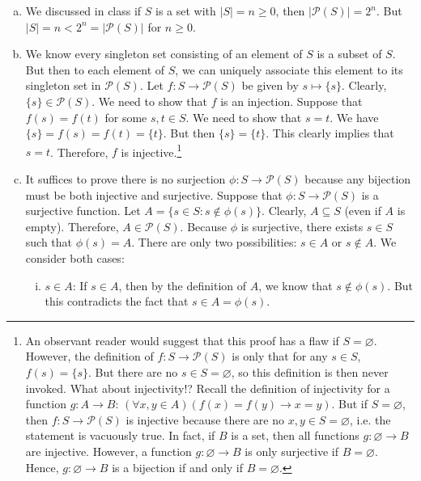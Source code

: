 \documentclass[11pt,letterpaper]{article}
\begin{document}
\sol 
\begin{enumerate}[(a)]
\item We discussed in class if $S$ is a set with $|S|= n \geq 0$, then $|\mathcal{P}(S)|= 2^n$. But $|S|= n < 2^n= |\mathcal{P}(S)|$ for $n \geq 0$. \pspace

\item We know every singleton set consisting of an element of $S$ is a subset of $S$. But then to each element of $S$, we can uniquely associate this element to its singleton set in $\mathcal{P}(S)$. Let $f: S \to \mathcal{P}(S)$ be given by $s \mapsto \{ s \}$. Clearly, $\{ s \} \in \mathcal{P}(S)$. We need to show that $f$ is an injection. Suppose that $f(s)= f(t)$ for some $s, t \in S$. We need to show that $s= t$. We have $\{ s \}= f(s)= f(t)= \{ t \}$. But then $\{ s \}= \{ t \}$. This clearly implies that $s= t$. Therefore, $f$ is injective.\footnote{An observant reader would suggest that this proof has a flaw if $S= \varnothing$. However, the definition of $f: S \to \mathcal{P}(S)$ is only that for any $s \in S$, $f(s)= \{ s \}$. But there are no $s \in S= \varnothing$, so this definition is then never invoked. What about injectivity!? Recall the definition of injectivity for a function $g: A \to B$: $(\forall x, y \in A)( f(x)= f(y) \to x= y)$. But if $S= \varnothing$, then $f: S \to \mathcal{P}(S)$ is injective because there are no $x, y \in S= \varnothing$, i.e. the statement is vacuously true. In fact, if $B$ is a set, then all functions $g: \varnothing \to B$ are injective. However, a function $g: \varnothing \to B$ is only surjective if $B= \varnothing$. Hence, $g: \varnothing \to B$ is a bijection if and only if $B= \varnothing$.} \pspace

\item It suffices to prove there is no surjection $\phi: S \to \mathcal{P}(S)$ because any bijection must be both injective and surjective. Suppose that $\phi: S \to \mathcal{P}(S)$ is a surjective function. Let $A= \{ s \in S \colon s \notin \phi(s) \}$. Clearly, $A \subseteq S$ (even if $A$ is empty). Therefore, $A \in \mathcal{P}(S)$. Because $\phi$ is surjective, there exists $s \in S$ such that $\phi(s)= A$. There are only two possibilities: $s \in A$ or $s \notin A$. We consider both cases:
	\begin{enumerate}[(i)]
	\item $s \in A$: If $s \in A$, then by the definition of $A$, we know that $s \notin \phi(s)$. But this contradicts the fact that $s \in A= \phi(s)$.
	

\end{enumerate}
\end{enumerate}
\end{document}
